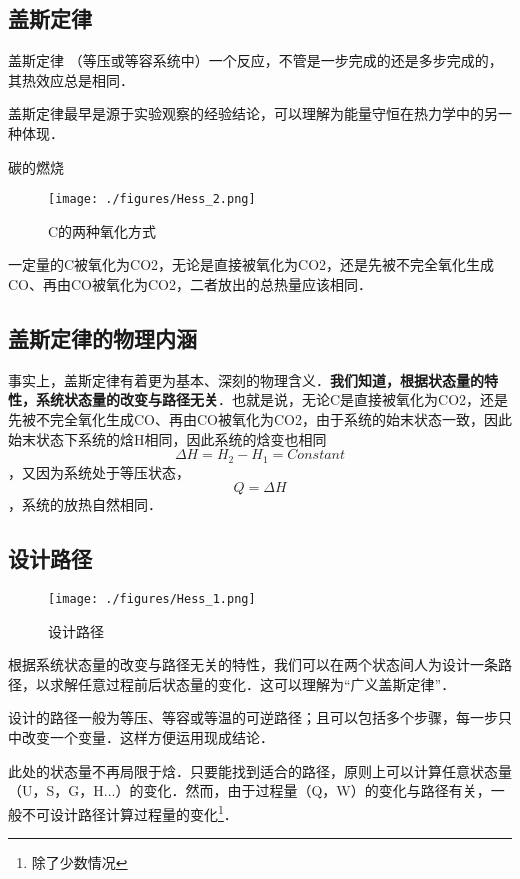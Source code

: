 
\subsection{盖斯定律}
\begin{theorem}{盖斯定律}
（等压或等容系统中）一个反应，不管是一步完成的还是多步完成的，其热效应总是相同．
\end{theorem}
盖斯定律最早是源于实验观察的经验结论，可以理解为能量守恒在热力学中的另一种体现．

\begin{example}{碳的燃烧}
\begin{figure}[ht]
\centering
\texttt{[image: ./figures/Hess\_2.png]}
\caption{C的两种氧化方式} \label{Hess_fig2}
\end{figure}
一定量的C被氧化为CO2，无论是直接被氧化为CO2，还是先被不完全氧化生成CO、再由CO被氧化为CO2，二者放出的总热量应该相同．
\end{example}

\subsection{盖斯定律的物理内涵}
事实上，盖斯定律有着更为基本、深刻的物理含义．\textbf{我们知道，根据状态量的特性，系统状态量的改变与路径无关}．也就是说，无论C是直接被氧化为CO2，还是先被不完全氧化生成CO、再由CO被氧化为CO2，由于系统的始末状态一致，因此始末状态下系统的焓H相同，因此系统的焓变也相同$$\Delta H=H_2-H_1=Constant$$，又因为系统处于等压状态，$$Q=\Delta H$$，系统的放热自然相同．

\subsection{设计路径}
\begin{figure}[ht]
\centering
\texttt{[image: ./figures/Hess\_1.png]}
\caption{设计路径} \label{Hess_fig1}
\end{figure}

根据系统状态量的改变与路径无关的特性，我们可以在两个状态间人为设计一条路径，以求解任意过程前后状态量的变化．这可以理解为“广义盖斯定律”．

设计的路径一般为等压、等容或等温的可逆路径；且可以包括多个步骤，每一步只中改变一个变量．这样方便运用现成结论．

此处的状态量不再局限于焓．只要能找到适合的路径，原则上可以计算任意状态量（U，S，G，H...）的变化．然而，由于过程量（Q，W）的变化与路径有关，一般不可设计路径计算过程量的变化\footnote{除了少数情况}．

